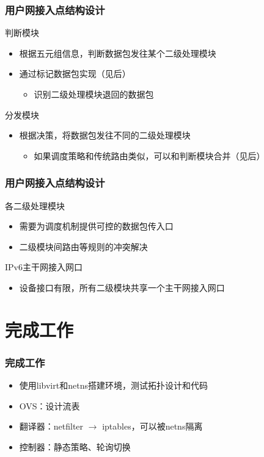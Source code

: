 \documentclass{beamer}
\begin{document}
\begin{frame}
  \frametitle{用户网接入点结构设计}
  \begin{block}{判断模块}
    \begin{itemize}
    \item 根据五元组信息，判断数据包发往某个二级处理模块
    \item 通过标记数据包实现（见后）
      \begin{itemize}
      \item 识别二级处理模块退回的数据包
      \end{itemize}
    \end{itemize}
  \end{block}

  \begin{block}{分发模块}
    \begin{itemize}
    \item 根据决策，将数据包发往不同的二级处理模块
      \begin{itemize}
      \item 如果调度策略和传统路由类似，可以和判断模块合并（见后） 
      \end{itemize}
    \end{itemize}
  \end{block}
\end{frame}

\begin{frame}
  \frametitle{用户网接入点结构设计}
  \begin{block}{各二级处理模块}
    \begin{itemize}
    \item 需要为调度机制提供可控的数据包传入口
    \item 二级模块间路由等规则的冲突解决
    \end{itemize}
  \end{block}

  \begin{block}{IPv6主干网接入网口}
    \begin{itemize}
    \item 设备接口有限，所有二级模块共享一个主干网接入网口
    \end{itemize}
  \end{block}
\end{frame}

\section{完成工作}
\begin{frame}
  \frametitle{完成工作}

  \begin{block}{}
    \begin{itemize}
    \item 使用libvirt和netns搭建环境，测试拓扑设计和代码
    \item OVS：设计流表
    \item 翻译器：netfilter $\rightarrow$ iptables，可以被netns隔离
    \item 控制器：静态策略、轮询切换
    \end{itemize}
  \end{block}
\end{frame}
\end{document}
